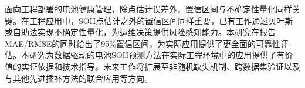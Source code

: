\documentclass[10pt,a4paper]{ctexart}
\begin{document}
面向工程部署的电池健康管理，除点估计误差外，置信区间与不确定性量化同样关键\cite{geng2025uqsoh}。在工程应用中，SOH点估计之外的置信区间同样重要，已有工作通过贝叶斯或自助法实现不确定性量化，为运维决策提供风险感知能力\cite{geng2025uqsoh}。本研究在报告MAE/RMSE的同时给出了95\%置信区间，为实际应用提供了更全面的可靠性评估。本研究为数据驱动的电池SOH预测方法在实际工程环境中的应用提供了有价值的实证依据和技术指导。未来工作将扩展至非随机缺失机制、跨数据集验证以及与其他先进插补方法的联合应用等方向。



\end{document}

